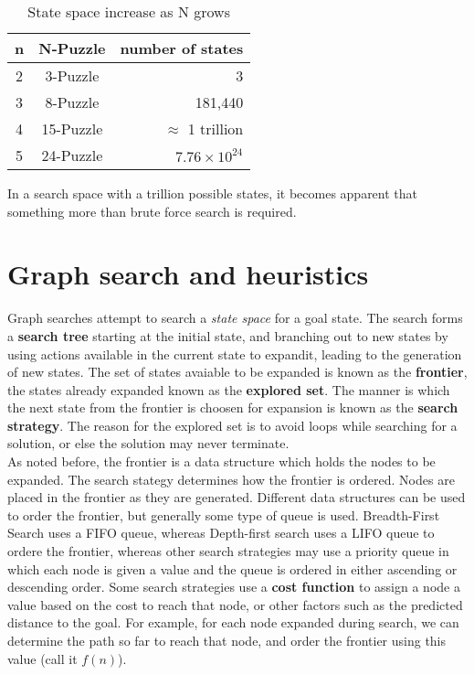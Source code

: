 \documentclass[a4, 12pt]{article}
\begin{document}
\begin{table}[H]
\centering
\caption{State space increase as N grows}
\begin{tabular}{c c r}
  n & N-Puzzle & number of states \\
  \hline
  2 & 3-Puzzle & 3 \\
 
  3 & 8-Puzzle & 181,440 \\

  4 & 15-Puzzle & $\approx$ 1 trillion \\

  5 & 24-Puzzle & $7.76 \times 10^{24}$ \\
\end{tabular}
\end{table}

In a search space with a trillion possible states, it becomes apparent that something more than brute force search is required. 


\section{Graph search and heuristics}
Graph searches attempt to search a \textit{state space} for a goal state. The search forms a \textbf{search tree} starting at the initial state, and branching out to new states by using actions available in the current state to expandit, leading to the generation of new states. The set of states avaiable to be expanded is known as the \textbf{frontier}, the states already expanded known as the \textbf{explored set}. The manner is which the next state from the frontier is choosen for expansion is known as the \textbf{search strategy}. The reason for the explored set is to avoid loops while searching for a solution, or else the solution may never terminate.   \\

As noted before, the frontier is a data structure which holds the nodes to be expanded. The search stategy determines how the frontier is ordered. Nodes are placed in the frontier as they are generated. Different data structures can be used to order the frontier, but generally some type of queue is used. Breadth-First Search uses a FIFO queue, whereas Depth-first search uses a LIFO queue to ordere the frontier, whereas other search strategies may use a priority queue in which each node is given a value and the queue is ordered in either ascending or descending order. Some search strategies use a \textbf{cost function} to assign a node a value based on the cost to reach that node, or other factors such as the predicted distance to the goal. For example, for each node expanded during search, we can determine the path so far to reach that node, and order the frontier using this value (call it $f(n)$). \\
\end{document}
